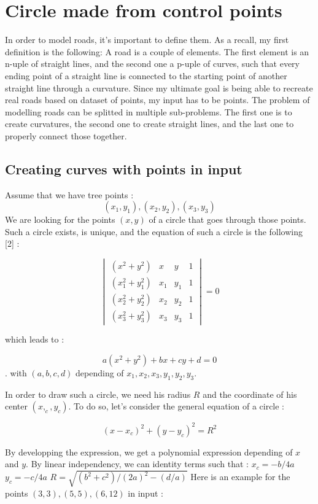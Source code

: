 \documentclass[a4paper,12pt,fleqn]{article}
\begin{document}
\section{Circle made from control points}
\label{sec:motivation}
In order to model roads, it’s important to define them. As a recall, my first definition is the following: A road is a couple of elements. The first element is an n-uple of straight lines, and the second one a p-uple of curves, such that every ending point of a straight line is connected to the starting point of another straight line through a curvature. Since my ultimate goal is being able to recreate real roads based on dataset of points, my input has to be points. The problem of modelling roads can be splitted in multiple sub-problems. The first one is to create curvatures, the second one to create straight lines, and the last one to properly connect those together.

\subsection{Creating curves with points in input}
\label{sec:example}
Assume that we have tree points  :
\[(x_1, y_1), (x_2, y_2), (x_3, y_3)\]
We are looking for the points \mbox{$(x,y)$} of a circle that goes through those points. Such a circle exists, is unique, and the equation of such a circle is the following [2] : 

\[
\begin{vmatrix}
(x^2 + y^2) & x & y & 1\\
(x_1^2 + y_1^2) & x_1 & y_1 & 1\\
(x_2^2 + y_2^2) & x_2 & y_2 & 1\\
(x_3^2 + y_3^2) & x_3 & y_3 & 1
\end{vmatrix}
=
0
\]

which leads to :

\[ a(x^2 + y^2) + bx + cy + d = 0 \].
with \mbox{$(a, b, c, d)$} depending of \mbox{$x_1, x_2, x_3, y_1, y_2, y_3$}.

In order to draw such a circle, we need his radius \mbox{$R$} and the coordinate of his center \mbox{$(x,_c,y_c)$}.
To do so, let's consider the general equation of a circle :  

\[ (x - x_c)^2 + (y - y_c)^2 = R^2\]

By developping the expression, we get a polynomial expression depending of \mbox{$x$} and \mbox{$y$}.
By linear independency, we can identity terms such that :
\newline
\newline
\mbox{$ x_c = -b/4a$}
\newline
 \mbox{$ y_c = -c/4a$} 
\newline
 \mbox{$ R = \sqrt{(b^2 + c^2)/(2a)^2 - (d/a)}$}
\newline
\newline
Here is an example for the points \mbox{$(3, 3), (5, 5), (6, 12)$} in input :
\end{document}
